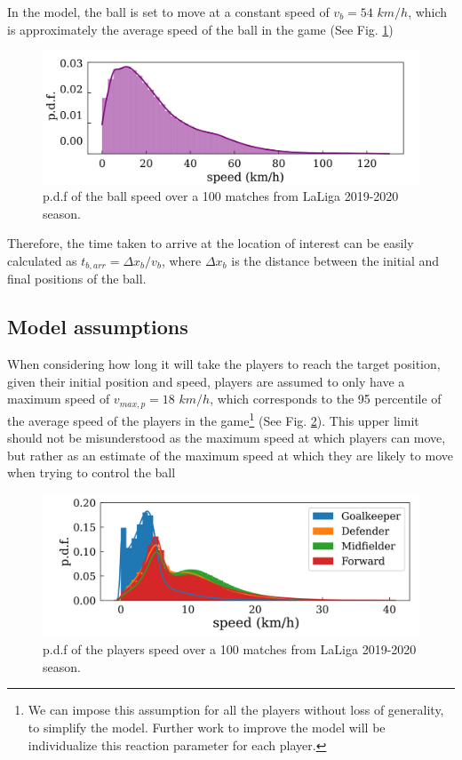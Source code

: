 \documentclass[
  10pt,
  twoside,nohyper]{book}
\begin{document}
In the model, the ball is set to move at a constant speed of \(v_b = 54\) \(km/h\), which is approximately the average speed of the ball in the game \citep{Spearman} (See Fig. \ref{fig:ball})

\begin{figure}[H]

{\centering \includegraphics[width=0.8\linewidth,]{imagenes/ball} 

}

\caption{p.d.f of the ball speed over a 100 matches from LaLiga 2019-2020 season.}\label{fig:ball}
\end{figure}

Therefore, the time taken to arrive at the location of interest can be easily calculated as \(t_{b,arr} = \Delta x_b/v_b\), where \(\Delta x_b\) is the distance between the initial and final positions of the ball.

\subsection{Model assumptions}\label{model-assumptions}

When considering how long it will take the players to reach the target position, given their initial position and speed, players are assumed to only have a maximum speed of \(v_{max,p} = 18\) \(km/h\), which corresponds to the 95 percentile of the average speed of the players in the game\footnote{We can impose this assumption for all the players without loss of generality, to simplify the model. Further work to improve the model will be individualize this reaction parameter for each player.} \citep{Spearman} (See Fig. \ref{fig:vel}). This upper limit should not be misunderstood as the maximum speed at which players can move, but rather as an estimate of the maximum speed at which they are likely to move when trying to control the ball

\begin{figure}[H]

{\centering \includegraphics[width=0.8\linewidth,]{imagenes/vel} 

}

\caption{p.d.f of the players speed over a 100 matches from LaLiga 2019-2020 season.}\label{fig:vel}
\end{figure}
\end{document}
